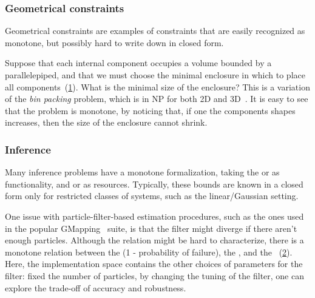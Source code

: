 \subsubsection{Geometrical constraints}

Geometrical constraints are examples of constraints that are easily recognized as monotone, but possibly hard to write down in closed form.

\begin{example}
    Suppose that each internal component occupies a volume bounded by a parallelepiped, and that we must choose the minimal enclosure in which to place all components~(\cref{fig:packing}).
    What is the minimal size of the enclosure?
    This is a variation of the \emph{bin packing} problem, which is in NP for both 2D and 3D~\cite{lodi02two}.
    It is easy to see that the problem is monotone, by noticing that, if one the components shapes increases, then the size of the enclosure cannot shrink.

\end{example}
\begin{figure}[tbh]
    \centering
    \caption{}
    \label{fig:packing}
\end{figure}

\subsubsection{Inference}

Many inference problems have a monotone formalization, taking the
 or  as functionality, and 
or  as resources.
Typically, these bounds are known in a closed form only for restricted classes of systems, such as the linear/Gaussian setting.

\begin{example}[SLAM]
    One issue with particle-filter-based estimation procedures, such as the ones used in the popular GMapping~\cite{grisetti07improved} suite, is that the filter might diverge if there aren't enough particles.
    Although the relation might be hard to characterize, there is a monotone relation between the  (1 - probability of failure), the , and the ~(\cref{fig:gmapping}).
    Here, the implementation space contains the other choices of parameters for the filter: fixed the number of particles, by changing the tuning of the filter, one can explore the trade-off of accuracy and robustness.
\end{example}
\begin{figure}[h]
    \centering
    \caption{}
    \label{fig:gmapping}
\end{figure}

